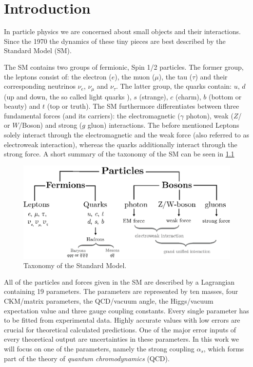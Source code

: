 \documentclass[../../index.tex]{subfiles}
\begin{document}
\chapter{Introduction}
In particle physics we are concerned about small objects and their interactions.
Since the 1970 the dynamics of these tiny pieces are best described by the Standard Model (SM).

The SM contains two groups of fermionic, Spin 1/2 particles. The former group,
the leptons consist of: the electron ($e$), the muon ($\mu$), the tau ($\tau$)
and their corresponding neutrinos $\nu_e$, $\nu_\mu$ and $\nu_\tau$. The latter
group, the quarks contain: $u$, $d$ (up and down, the so called light quarks ),
$s$ (strange), $c$ (charm), $b$ (bottom or beauty) and $t$ (top or truth). The SM
furthermore differentiates between three fundamental forces (and its carriers):
the electromagnetic ($\gamma$ photon), weak ($Z$\-/ or $W$\-/Boson) and strong ($g$
gluon) interactions. The before mentioned Leptons solely interact through the
electromagnetic and the weak force (also referred to as electroweak interaction),
whereas the quarks additionally interact through the strong force. A short
summary of the taxonomy of the SM can be seen in \cref{fig:SMTaxonomy}
\begin{figure}
  \centering
  \includegraphics[width=\textwidth]{./images/standardModelTaxonomy.eps}
  \caption{Taxonomy of the Standard Model.}
  \label{fig:SMTaxonomy}
\end{figure}

All of the particles and forces given in the SM are described by a Lagrangian
containing 19 parameters. The parameters are represented by ten masses, four CKM\-/matrix parameters, the QCD\-/vacuum
angle, the Higgs\-/vacuum expectation value and three gauge coupling constants.
Every single parameter has to be fitted from experimental data. Highly accurate
values with low errors are crucial for theoretical calculated predictions. One
of the major error inputs of every theoretical output are uncertainties in these
parameters. In this work we will focus on one of the parameters, namely the
strong coupling $\alpha_s$, which forms part of the theory of
\textit{quantum chromodynamics} (QCD).
\end{document}
